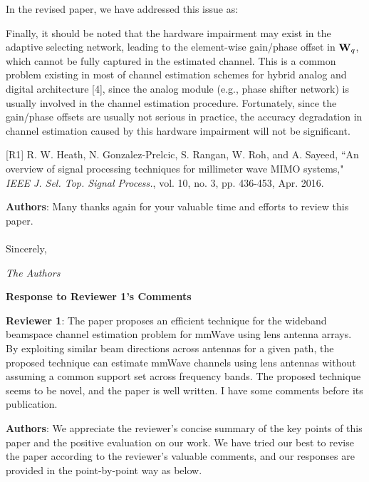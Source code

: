 \documentclass[a4paper,12pt]{article}
\begin{document}
{In the revised paper, we have addressed this issue as:
\begin{framed}
{\color{red} Finally, it should be noted that the hardware impairment may exist in the adaptive selecting network, leading to the element-wise gain/phase offset in ${{{\bf{W}}_q}}$, which cannot be fully captured in the estimated channel. This is a common problem existing in most of channel estimation schemes for hybrid analog and digital architecture [4], since the analog module (e.g., phase shifter network) is usually involved in the channel estimation procedure. Fortunately, since the gain/phase offsets are usually not serious in practice, the accuracy degradation in channel estimation caused by this hardware impairment will not be significant.}
\end{framed}

[R1] R. W. Heath, N. Gonzalez-Prelcic, S. Rangan, W. Roh, and A. Sayeed, ``An overview of signal processing techniques for millimeter wave MIMO systems," {\it IEEE J. Sel. Top. Signal Process.}, vol. 10, no. 3, pp. 436-453, Apr. 2016.



\vbox{}

{\color{blue} \textbf{Authors}: Many thanks again for your valuable time and efforts to review this paper.
\\
\\
Sincerely,

 {\it The Authors}}


}




\clearpage
\begin{center}
 {\Large\bf Response to Reviewer 1's Comments}
\end{center}


\textbf{Reviewer 1}: The paper proposes an efficient technique for the wideband beamspace channel estimation problem for mmWave using lens antenna arrays. By exploiting similar beam directions across antennas for a given path, the proposed technique can estimate mmWave channels using lens antennas without assuming a common support set across frequency bands. The proposed technique seems to be novel, and the paper is well written. I have some comments before its publication.


{\color{blue} \textbf{Authors}: We appreciate the reviewer's concise summary of the key points of this paper and the positive evaluation on our work. We have tried our best to revise the paper according to the reviewer's valuable comments, and our responses are provided in the point-by-point way as below.}
\end{document}
